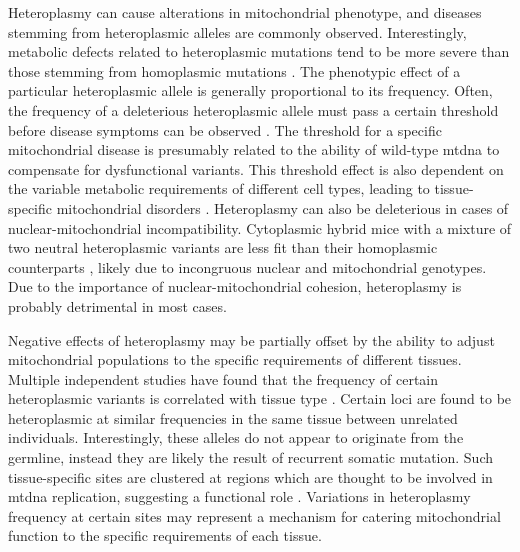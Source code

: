 \documentclass[12pt,twoside]{reedthesis}
\begin{document}
Heteroplasmy can cause alterations in mitochondrial phenotype, and diseases stemming from heteroplasmic alleles are commonly observed.
Interestingly, metabolic defects related to heteroplasmic mutations tend to be more severe than those stemming from homoplasmic mutations \citep{stewart_dynamics_2015}.
The phenotypic effect of a particular heteroplasmic allele is generally proportional to its frequency.
Often, the frequency of a deleterious heteroplasmic allele must pass a certain threshold before disease symptoms can be observed \citep{taylor_mitochondrial_2005}.
The threshold for a specific mitochondrial disease is presumably related to the ability of wild-type \gls{mtdna} to compensate for dysfunctional variants.
This threshold effect is also dependent on the variable metabolic requirements of different cell types, leading to tissue-specific mitochondrial disorders \citep{taylor_mitochondrial_2005}. 
Heteroplasmy can also be deleterious in cases of nuclear-mitochondrial incompatibility.
Cytoplasmic hybrid mice with a mixture of two neutral heteroplasmic variants are less fit than their homoplasmic counterparts \citep{sharpley_heteroplasmy_2012}, likely due to incongruous nuclear and mitochondrial genotypes.
Due to the importance of nuclear-mitochondrial cohesion, heteroplasmy is probably detrimental in most cases.


Negative effects of heteroplasmy may be partially offset by the ability to adjust mitochondrial populations to the specific requirements of different tissues.
Multiple independent studies have found that the frequency of certain heteroplasmic variants is correlated with tissue type \citep{samuels_recurrent_2013, li_extensive_2015, naue_evidence_2015}.
Certain loci are found to be heteroplasmic at similar frequencies in the same tissue between unrelated individuals. 
Interestingly, these alleles do not appear to originate from the germline, instead they are likely the result of recurrent somatic mutation.
Such tissue-specific sites are clustered at regions which are thought to be involved in \gls{mtdna} replication, suggesting a functional role \citep{samuels_recurrent_2013}.
Variations in heteroplasmy frequency at certain sites may represent a mechanism for catering mitochondrial function to the specific requirements of each tissue.
\end{document}
